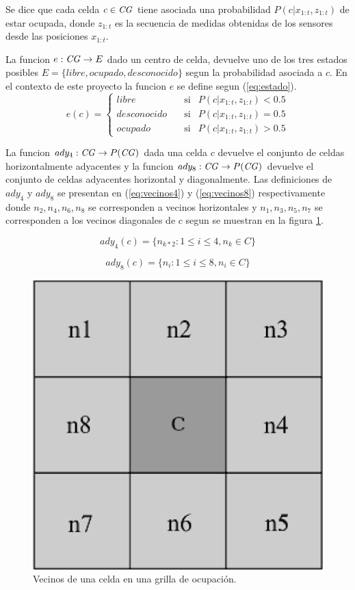 Se dice que cada celda $c\in \mathit{CG}$ tiene asociada una probabilidad $P(c|x_{1:t},z_{1:t})$
de estar ocupada, donde $z_{1:t}$ es la secuencia de medidas obtenidas de los
sensores desde las posiciones $x_{1:t}$.

La funcion $e : \mathit{CG} \rightarrow E$ dado un centro de celda, devuelve uno de los
tres estados posibles $E=\{libre, ocupado, desconocido\}$ segun la probabilidad
asociada a $c$. En el contexto de este proyecto la funcion $e$ se define segun
(\ref{eq:estado}).
\begin{equation} 
  e(c)= 
  \left \{ 
    \begin{aligned}
       libre       &\ \ \ \text{ si}& P(c|x_{1:t},z_{1:t}) < 0.5 \\
       desconocido &\ \ \ \text{ si}& P(c|x_{1:t},z_{1:t}) = 0.5 \\
       ocupado     &\ \ \ \text{ si}& P(c|x_{1:t},z_{1:t}) > 0.5
    \end{aligned}
  \right .
  \label{eq:estado}
\end{equation}

La funcion $ady_4 : \mathit{CG} \rightarrow P(\mathit{CG})$ dada una celda $c$ devuelve el conjunto
de celdas horizontalmente adyacentes y la funcion $ady_8 : \mathit{CG} \rightarrow P(\mathit{CG})$
devuelve el conjunto de celdas adyacentes horizontal y diagonalmente. Las
definiciones de $ady_4$ y $ady_8$ se presentan en (\ref{eq:vecinos4}) y
(\ref{eq:vecinos8}) respectivamente donde $n_2, n_4, n_6, n_8$ se corresponden
a vecinos horizontales y $n_1, n_3, n_5, n_7$ se corresponden a los vecinos
diagonales de $c$ segun se muestran en la figura \ref{fig:vecinos}.

\begin{equation} 
 ady_4(c)=\{n_{k*2} : 1\leq i \leq 4, n_k \in C\}
 \label{eq:vecinos4}
\end{equation} 

\begin{equation} 
 ady_8(c)=\{n_i : 1\leq i \leq 8, n_i \in C\}
 \label{eq:vecinos8}
\end{equation} 

\begin{figure}[H]
  \center
  \includegraphics[width=0.3\linewidth]{imagenes/vecinosSharp.png}
  \caption[Vecinos de una celda en una grilla de ocupación.]{Vecinos de una celda en una grilla de ocupación.}
  \label{fig:vecinos}
\end{figure} 

